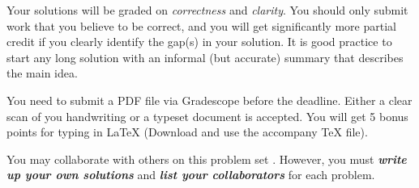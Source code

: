 
Your solutions will be graded on \emph{correctness} and
\emph{clarity}. You should only submit work that you believe to be
correct, and you will get significantly more partial credit if you
clearly identify the gap(s) in your solution. It is good practice to
start any long solution with an informal (but accurate) summary that
describes the main idea.

You need to submit a PDF file via Gradescope before the
deadline. Either a clear scan of you handwriting or a typeset document
is accepted. You will get 5 bonus points for typing in LaTeX (Download
and use the accompany TeX file).

\medskip
\noindent You may collaborate with others on this problem set%
.  However, you must \textbf{\emph{write up your own solutions}} and
\textbf{\emph{list your collaborators}} for each problem.

